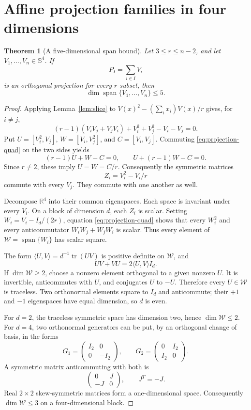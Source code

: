 \documentclass[11pt]{article}
\newtheorem{theorem}{Theorem}[section]
\theoremstyle{remark}\newtheorem{remark}[theorem]{Remark}
\newcommand{\Sym}{\mathbb S}
\newcommand{\R}{\mathbb R}
\newcommand{\tr}{\operatorname{tr}}
\newcommand{\Span}{\operatorname{span}}
\newcommand{\ip}[2]{\langle #1,#2\rangle}
\begin{document}
\section{Affine projection families in four dimensions}
\begin{theorem}[A five-dimensional span bound]\label{thm:projection}
Let $3\leq r\leq n-2$, and let $V_1,\ldots,V_n\in\Sym^4$. If
\[
 P_I=\sum_{i\in I}V_i
\]
is an orthogonal projection for every $r$-subset, then
\begin{equation}\label{eq:five}
 \dim\Span\{V_1,\ldots,V_n\}\leq5.
\end{equation}
\end{theorem}
\begin{proof}
Applying Lemma~\ref{lem:slice} to
$V(x)^2-(\sum_i x_i)V(x)/r$ gives, for $i\ne j$,
\begin{equation}\label{eq:projection-quad}
 (r-1)(V_iV_j+V_jV_i)+V_i^2+V_j^2-V_i-V_j=0.
\end{equation}
Put $U=[V_i^2,V_j]$, $W=[V_i,V_j^2]$, and $C=[V_i,V_j]$. Commuting \eqref{eq:projection-quad} on the two sides yields
\[
 (r-1)U+W-C=0,\qquad U+(r-1)W-C=0.
\]
Since $r\ne2$, these imply $U=W=C/r$. Consequently the symmetric matrices
\[
 Z_i=V_i^2-V_i/r
\]
commute with every $V_j$. They commute with one another as well.

Decompose $\R^4$ into their common eigenspaces. Each space is invariant under every $V_i$. On a block of dimension $d$, each $Z_i$ is scalar. Setting $W_i=V_i-I_d/(2r)$, equation \eqref{eq:projection-quad} shows that every $W_i^2$ and every anticommutator $W_iW_j+W_jW_i$ is scalar. Thus every element of $\mathcal W=\Span\{W_i\}$ has scalar square.

The form $\ip UV=d^{-1}\tr(UV)$ is positive definite on $\mathcal W$, and
\[
 UV+VU=2\ip UV I_d.
\]
If $\dim\mathcal W\geq2$, choose a nonzero element orthogonal to a given nonzero $U$. It is invertible, anticommutes with $U$, and conjugates $U$ to $-U$. Therefore every $U\in\mathcal W$ is traceless. Two orthonormal elements square to $I_d$ and anticommute; their $+1$ and $-1$ eigenspaces have equal dimension, so $d$ is even.

For $d=2$, the traceless symmetric space has dimension two, hence $\dim\mathcal W\leq2$. For $d=4$, two orthonormal generators can be put, by an orthogonal change of basis, in the forms
\[
 G_1=\begin{pmatrix}I_2&0\\0&-I_2\end{pmatrix},\qquad
 G_2=\begin{pmatrix}0&I_2\\I_2&0\end{pmatrix}.
\]
A symmetric matrix anticommuting with both is
\[
 \begin{pmatrix}0&J\\-J&0\end{pmatrix},\qquad J^T=-J.
\]
Real $2\times2$ skew-symmetric matrices form a one-dimensional space. Consequently $\dim\mathcal W\leq3$ on a four-dimensional block.


\end{proof}
\end{document}
